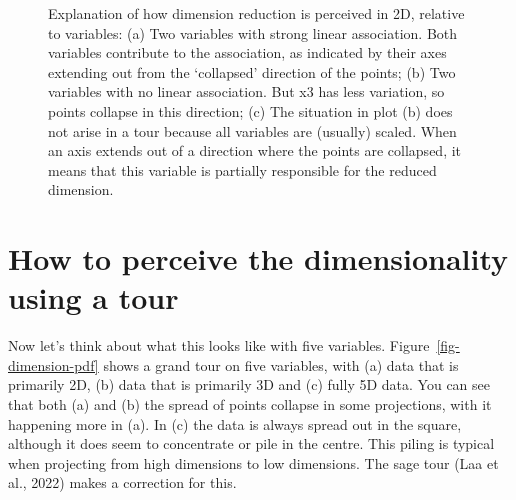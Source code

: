 \documentclass[
  letterpaper,
]{krantz}
\begin{document}
\begin{figure}


\caption{\label{fig-2D}Explanation of how dimension reduction is
perceived in 2D, relative to variables: (a) Two variables with strong
linear association. Both variables contribute to the association, as
indicated by their axes extending out from the `collapsed' direction of
the points; (b) Two variables with no linear association. But x3 has
less variation, so points collapse in this direction; (c) The situation
in plot (b) does not arise in a tour because all variables are (usually)
scaled. When an axis extends out of a direction where the points are
collapsed, it means that this variable is partially responsible for the
reduced dimension.}

\end{figure}%

\section{How to perceive the dimensionality using a
tour}\label{how-to-perceive-the-dimensionality-using-a-tour}

Now let's think about what this looks like with five variables.
Figure~\ref{fig-dimension-pdf} shows a grand tour on five variables,
with (a) data that is primarily 2D, (b) data that is primarily 3D and
(c) fully 5D data. You can see that both (a) and (b) the spread of
points collapse in some projections, with it happening more in (a). In
(c) the data is always spread out in the square, although it does seem
to concentrate or pile in the centre. This piling is typical when
projecting from high dimensions to low dimensions. The sage tour (Laa et
al., 2022) makes a correction for this.
\end{document}

